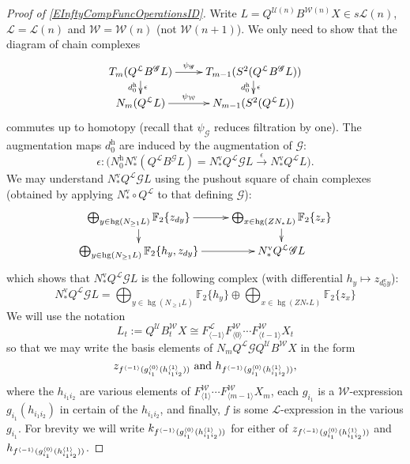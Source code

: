 \documentclass[11pt]{amsart} \renewcommand{\baselinestretch}{1.2}
\theoremstyle{plain}
\theoremstyle{definition}
\DeclareMathOperator{\homog}{hg}
\renewcommand{\to}{\longrightarrow}
\newcommand{\scrG}{\mathscr{G}}
\newcommand{\calU}{\mathcal{U}}
\newcommand{\calL}{\mathcal{L}}
\newcommand{\calw}{\mathcal{W}}
\newcommand{\call}{\mathcal{L}}
\newcommand{\BSW}{{\scrG}}
\newcommand{\BSWres}{B^\BSW}%
\newcommand{\F}{\mathbb{F}}
\newcommand{\Ftwo}{\F_2}
\newcommand{\uver}{^\mathrm{v}}
\newcommand{\uhor}{^\mathrm{h}}
\renewcommand{\mapsto}{\longmapsto}
\begin{document}
\begin{Operations in composite functor spectral sequences}
\begin{proof}[Proof of \ref{EInftyCompFuncOperationsID}]
Write $L=Q^{\calU(n)} B^{\calw(n)}X \in s\calL(n)$,  $\calL=\calL(n)$ and $\calw=\calw(n)$ (not $\calw(n+1)$). We only need to show that the diagram of chain complexes
\[\xymatrix@R=4mm{
T_{m}(Q^{\calL}\BSWres L)
\ar[r]^-{\psi_\BSW}
\ar[d]^-{\epsilon}_-{d\uhor_0}
&%
T_{m-1}(S^2(Q^{\calL}\BSWres L))\ar[d]^-{\epsilon}_-{d\uhor_0}
\\%
N_{m}(Q^{\calL}L)
\ar[r]^-{\psi_{\calw}}
&%
N_{m-1}(S^2(Q^{\calL} L))
}\]
commutes up to homotopy (recall that $\psi_\BSW$ reduces filtration by one).  The augmentation maps $d\uhor_0$ are induced by the augmentation of $\BSW$:
\[\epsilon:\bigl(N\uhor_0N\uver_*(Q^{\call}\BSWres L)= N\uver_*Q^{\calL}\BSW L\overset{\epsilon}{\to} N\uver_*Q^{\calL}L\bigr). \]%
We may understand $ N\uver_*Q^{\calL}\BSW L$ using the pushout square of chain complexes (obtained by applying $N\uver_*\circ Q^{\call} $ to that defining $\BSW$):
\[\xymatrix@R=4mm{
\bigoplus_{y\in \homog (N_{\geq1}L)}\Ftwo\{z_{dy}\}
\ar[r]\ar[d]%
&%
\bigoplus_{x\in \homog (ZN_*L)}\Ftwo\{z_{x}\}\ar[d]\\%
\bigoplus_{y\in \homog (N_{\geq1}L)}\Ftwo\{h_y,z_{dy}\}
\ar[r]&%
N\uver_*Q^{\call}\BSW L%
}\]
which shows that $N\uver_*Q^{\call}\BSW L$ is the following complex (with differential $h_{y}\mapsto z_{d\uver_0y}$):
\[N\uver_*Q^{\call}\BSW L=\textstyle\bigoplus_{y\in \homog (N_{\geq1}L)}\Ftwo\{h_y\}\oplus \bigoplus_{x\in \homog (ZN_*L)}\Ftwo\{z_{x}\}\]
We will use the notation
\[L_t:=Q^{\calU}B^{\calw}_tX \cong F^{\calL}_{\langle -1\rangle}F^{\calw}_{\langle 0\rangle}\cdots F^{\calw}_{\langle t-1\rangle}X_t\]
so that we may write the basis elements of $N_mQ^{\calL}\BSW Q^{\calU}B^{\calw}X$ in the form
\[z_{f^{\langle -1\rangle}(g^{\smash{\langle} 0\smash{\rangle}}_{i_1}(h^{\smash{\langle} 1\smash{\rangle}}_{i_1i_2}))} \textup{ and }h_{f^{\langle -1\rangle}(g^{\smash{\langle} 0\smash{\rangle}}_{i_1}(h^{\smash{\langle} 1\smash{\rangle}}_{i_1i_2}))},\]
where the $h_{i_1i_2} $ are various elements of $ F^{\calw}_{\langle 1\rangle}\cdots F^{\calw}_{\langle m-1\rangle}X_m$, each $g_{i_1}$ is a $\calw$-expression $g_{i_1}(h_{i_1i_2})$ in certain of the $h_{i_1i_2}$, and finally, $f$ is some $\calL$-expression in the various $g_{i_1}$. %
For brevity we will write $k_{f^{\langle -1\rangle}(g^{\smash{\langle} 0\smash{\rangle}}_{i_1}(h^{\smash{\langle} 1\smash{\rangle}}_{i_1i_2}))}$ for either of $z_{f^{\langle -1\rangle}(g^{\smash{\langle} 0\smash{\rangle}}_{i_1}(h^{\smash{\langle} 1\smash{\rangle}}_{i_1i_2}))}$ and $h_{f^{\langle -1\rangle}(g^{\smash{\langle} 0\smash{\rangle}}_{i_1}(h^{\smash{\langle} 1\smash{\rangle}}_{i_1i_2}))}$.


\end{proof}
\end{Operations in composite functor spectral sequences}
\end{document}
